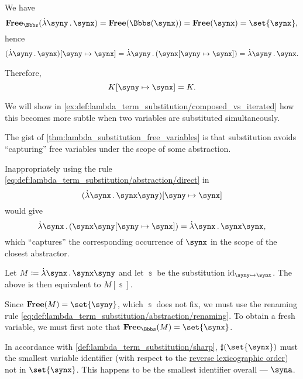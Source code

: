 \begin{example}
\begin{thmenum}
    We have
    \begin{equation*}
      \op*{Free}_\Bbbs(\qabs \syny \synx)
      =
      \op*{Free}(\Bbbs(\synx))
      =
      \op*{Free}(\synx)
      =
      \set{ \synx },
    \end{equation*}
    hence
    \begin{align*}
      (\qabs \syny \synx)[\syny \mapsto \synx]
      =
      \qabs \syny (\synx[\syny \mapsto \synx])
      =
      \qabs \syny \synx.
    \end{align*}

    Therefore,
    \begin{equation*}
      K[\syny \mapsto \synx] = K.
    \end{equation*}

    We will show in \cref{ex:def:lambda_term_substitution/composed_vs_iterated} how this becomes more subtle when two variables are substituted simultaneously.

     The gist of \cref{thm:lambda_substitution_free_variables} is that substitution avoids \enquote{capturing} free variables under the scope of some abstraction.

    Inappropriately using the rule \eqref{eq:def:lambda_term_substitution/abstraction/direct} in
    \begin{equation*}
      (\qabs \synx \synx \syny)[\syny \mapsto \synx]
    \end{equation*}
    would give
    \begin{equation*}
      \qabs \synx (\synx \syny[\syny \mapsto \synx]) = \qabs \synx \synx \synx,
    \end{equation*}
    which \enquote{captures} the corresponding occurrence of \( \synx \) in the scope of the closest abstractor.

    Let \( M \coloneqq \qabs \synx \synx \syny \) and let \( \Bbbs \) be the substitution \( \id_{\syny \mapsto \synx} \). The above is then equivalent to \( M[\Bbbs] \).

    Since \( \op*{Free}(M) = \set{ \syny } \), which \( \Bbbs \) does not fix, we must use the renaming rule \eqref{eq:def:lambda_term_substitution/abstraction/renaming}. To obtain a fresh variable, we must first note that \( \op*{Free}_\Bbbs(M) = \set{ \synx } \).

    In accordance with \cref{def:lambda_term_substitution/sharp}, \( \sharp(\set{ \synx }) \) must the smallest variable identifier (with respect to the \hyperref[def:lexicographic_order]{reverse lexicographic order}) not in \( \set{ \synx } \). This happens to be the smallest identifier overall --- \( \syna \).


\end{thmenum}
\end{example}
